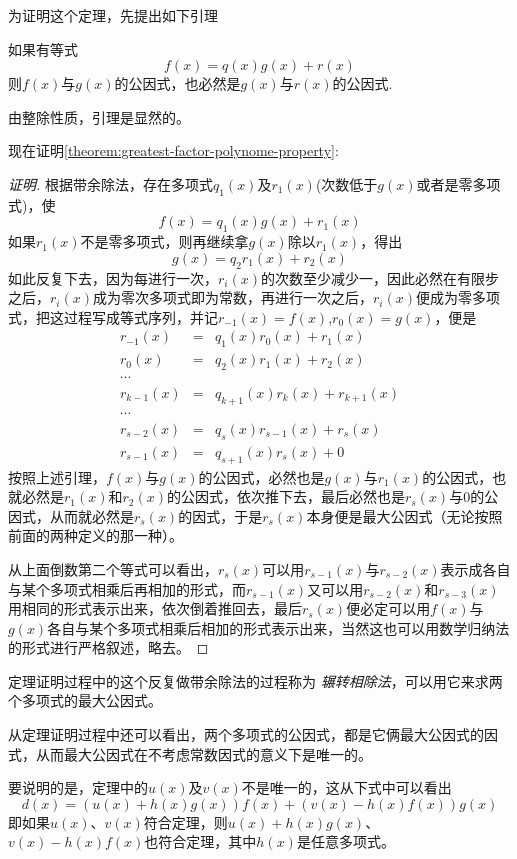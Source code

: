 为证明这个定理，先提出如下引理
\begin{lemma}
  如果有等式
  \[ f(x)=q(x)g(x)+r(x) \]
  则$f(x)$与$g(x)$的公因式，也必然是$g(x)$与$r(x)$的公因式.
\end{lemma}
由整除性质，引理是显然的。

现在证明\autoref{theorem:greatest-factor-polynome-property}:
\begin{proof}[证明]
  根据带余除法，存在多项式$q_1(x)$及$r_1(x)$(次数低于$g(x)$或者是零多项式)，使
  \[ f(x)=q_1(x)g(x)+r_1(x) \]
  如果$r_1(x)$不是零多项式，则再继续拿$g(x)$除以$r_1(x)$，得出
  \[ g(x) = q_2r_1(x)+r_2(x) \]
  如此反复下去，因为每进行一次，$r_i(x)$的次数至少减少一，因此必然在有限步之后，$r_i(x)$成为零次多项式即为常数，再进行一次之后，$r_i(x)$便成为零多项式，把这过程写成等式序列，并记$r_{-1}(x)=f(x)$,$r_0(x)=g(x)$，便是
  \begin{eqnarray*}
    r_{-1}(x) & = & q_1(x)r_0(x)+r_1(x) \\
    r_0(x) & = & q_2(x)r_1(x)+r_2(x) \\
    \cdots \\
    r_{k-1}(x) & = & q_{k+1}(x)r_k(x)+r_{k+1}(x) \\
    \cdots \\
    r_{s-2}(x) & = & q_s(x)r_{s-1}(x) + r_s(x) \\
    r_{s-1}(x) & = & q_{s+1}(x)r_s(x) + 0
  \end{eqnarray*}
  按照上述引理，$f(x)$与$g(x)$的公因式，必然也是$g(x)$与$r_1(x)$的公因式，也就必然是$r_1(x)$和$r_2(x)$的公因式，依次推下去，最后必然也是$r_s(x)$与0的公因式，从而就必然是$r_s(x)$的因式，于是$r_s(x)$本身便是最大公因式（无论按照前面的两种定义的那一种）。

  从上面倒数第二个等式可以看出，$r_s(x)$可以用$r_{s-1}(x)$与$r_{s-2}(x)$表示成各自与某个多项式相乘后再相加的形式，而$r_{s-1}(x)$又可以用$r_{s-2}(x)$和$r_{s-3}(x)$用相同的形式表示出来，依次倒着推回去，最后$r_s(x)$便必定可以用$f(x)$与$g(x)$各自与某个多项式相乘后相加的形式表示出来，当然这也可以用数学归纳法的形式进行严格叙述，略去。
\end{proof}

定理证明过程中的这个反复做带余除法的过程称为 \emph{辗转相除法}，可以用它来求两个多项式的最大公因式。

从定理证明过程中还可以看出，两个多项式的公因式，都是它俩最大公因式的因式，从而最大公因式在不考虑常数因式的意义下是唯一的。

要说明的是，定理中的$u(x)$及$v(x)$不是唯一的，这从下式中可以看出
\[ d(x) = (u(x)+h(x)g(x))f(x)+(v(x)-h(x)f(x))g(x) \]
即如果$u(x)$、$v(x)$符合定理，则$u(x)+h(x)g(x)$、$v(x)-h(x)f(x)$也符合定理，其中$h(x)$是任意多项式。

